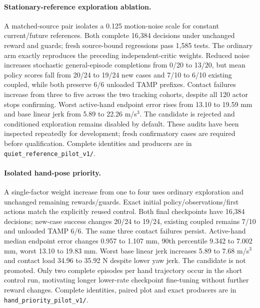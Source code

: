 \paragraph{Stationary-reference exploration ablation.}
A matched-source pair isolates a 0.125 motion-noise scale for constant
current/future references. Both complete 16,384 decisions under unchanged
reward and guards; fresh source-bound regressions pass 1,585 tests. The ordinary
arm exactly reproduces the preceding independent-critic weights. Reduced noise
increases stochastic general-episode completions from 0/20 to 13/20, but mean
policy scores fall from 20/24 to 19/24 new cases and 7/10 to 6/10 existing
coupled, while both preserve 6/6 unloaded TAMP prefixes. Contact failures
increase from three to five across the two tracking cohorts, despite all 120
actor stops confirming. Worst active-hand endpoint error rises from 13.10 to
19.59 mm and base linear jerk from 5.89 to 22.26 m/s$^3$. The candidate is
rejected and conditioned exploration remains disabled by default. These audits
have been inspected repeatedly for development; fresh confirmatory cases are
required before qualification. Complete identities and producers are in
\texttt{quiet\_reference\_pilot\_v1/}.


\paragraph{Isolated hand-pose priority.}
A single-factor weight increase from one to four uses ordinary exploration and
unchanged remaining rewards/guards. Exact initial policy/observations/first
actions match the explicitly reused control. Both final checkpoints have 16,384
decisions; new-case success changes 20/24 to 19/24, existing coupled remains
7/10 and unloaded TAMP 6/6. The same three contact failures persist. Active-hand
median endpoint error changes 0.957 to 1.107 mm, 90th percentile 9.342 to
7.002 mm, worst 13.10 to 19.83 mm. Worst base linear jerk increases 5.89 to
7.68 m/s$^3$ and contact load 34.96 to 35.92 N despite lower yaw jerk.
The candidate is not promoted. Only two complete episodes per hand trajectory
occur in the short control run, motivating longer lower-rate checkpoint
fine-tuning without further reward changes. Complete identities, paired plot
and exact producers are in \texttt{hand\_priority\_pilot\_v1/}.


